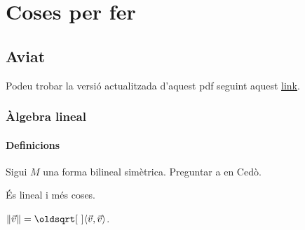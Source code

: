 \documentclass[../Apunts.tex]{subfiles}
\begin{document}
\part{Coses per fer}
\chapter{Aviat}
	Podeu trobar la versió actualitzada d'aquest pdf seguint aquest \href{https://claudilleyda.github.io}{link}.
\section{Àlgebra lineal}
	\subsection{Definicions}
	\begin{definition}
		\label{def:bilineal definida estrictament positiva/negativa}
		Sigui \(M\) una forma bilineal simètrica. Preguntar a en Cedò.
	\end{definition}
	\begin{definition}
		\label{def:Norma d'una aplicació lineal}
	\end{definition}
	\begin{definition}
		\label{def:producte escalar}
		És lineal i més coses.
	\end{definition}
	\begin{definition}
		\label{def:norma d'un vector}
		\(\norm{\vec{v}}=\sqrt{\prodesc{\vec{v}}{\vec{v}}}\).
	\end{definition}
	\begin{definition}
		\label{def:dependència lineal}
		\label{def:vectors linealment dependents}
	\end{definition}
\end{document}
